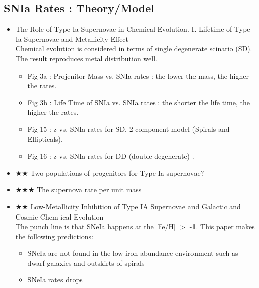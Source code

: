 \subsection{SNIa Rates : Theory/Model}
\begin{itemize}
\item The Role of Type Ia Supernovae in Chemical Evolution. I. Lifetime of Type Ia
Supernovae and Metallicity Effect \citep{kobayashi09a}\\
Chemical evolution is considered in terms of single degenerate scinario (SD).
The result reproduces metal distribution well.
\begin{itemize}
\item Fig 3a : Projenitor Mass vs. SNIa rates : the lower the mass, the higher the rates.
\item Fig 3b : Life Time of SNIa vs. SNIa rates : the shorter the life time, the higher the rates.
\item Fig 15 : z vs. SNIa rates for SD.  2 component model (Spirals and Ellipticals).
\item Fig 16 : z vs. SNIa rates for DD (double degenerate) .
\end{itemize}

\item $\bigstar\bigstar$ Two populations of progenitors for Type Ia supernovae? \citep[][\#152:4/30/10,mannucci06a]{mannucci06a}\\

\item $\bigstar\bigstar\bigstar$ The supernova rate per unit mass \citep[][\#204:4/30/10,mannucci05a]{mannucci05a}

\item $\bigstar\bigstar$ Low-Metallicity Inhibition of Type IA Supernovae and Galactic and Cosmic Chem
ical Evolution
\citep[][\#152, 5/4/10, kobayashi98a]{kobayaoshi98a}\\
The punch line is that SNeIa happens at the [Fe/H] $>$ -1.
This paper makes the following predictions:
 \begin{itemize}
 \item SNeIa are not found in the low iron abundance environment such as dwarf galaxies
 and outskirts of spirals
 \item SNeIa rates drops
 \end{itemize}

\end{itemize}

